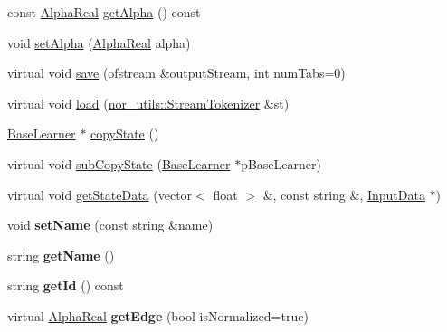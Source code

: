 \begin{DoxyCompactItemize}
\item 
const \hyperlink{Defaults_8h_a80184c4fd10ab70a1a17c5f97dcd1563}{AlphaReal} \hyperlink{classMultiBoost_1_1BaseLearner_acf6c8a1548a2d470172be70ac779a23d}{getAlpha} () const 
\item 
void \hyperlink{classMultiBoost_1_1BaseLearner_a14801c41060f93d612b3f8b143b7641a}{setAlpha} (\hyperlink{Defaults_8h_a80184c4fd10ab70a1a17c5f97dcd1563}{AlphaReal} alpha)
\item 
virtual void \hyperlink{classMultiBoost_1_1BaseLearner_a54e72961217720b3d37083bd07ddf65d}{save} (ofstream \&outputStream, int numTabs=0)
\item 
virtual void \hyperlink{classMultiBoost_1_1BaseLearner_aab8bdddad2c32654a2e77bbaac79345d}{load} (\hyperlink{classnor__utils_1_1StreamTokenizer}{nor\_\-utils::StreamTokenizer} \&st)
\item 
\hyperlink{classMultiBoost_1_1BaseLearner}{BaseLearner} $\ast$ \hyperlink{classMultiBoost_1_1BaseLearner_a80dbf3868f40d419f5bfd9a9469be64f}{copyState} ()
\item 
virtual void \hyperlink{classMultiBoost_1_1BaseLearner_a97532baab5306b08014a2de84c0afcc1}{subCopyState} (\hyperlink{classMultiBoost_1_1BaseLearner}{BaseLearner} $\ast$pBaseLearner)
\item 
virtual void \hyperlink{classMultiBoost_1_1BaseLearner_aa8945cc5179e0b732728571848bfb52f}{getStateData} (vector$<$ float $>$ \&, const string \&, \hyperlink{classMultiBoost_1_1InputData}{InputData} $\ast$)
\item 
\hypertarget{classMultiBoost_1_1BaseLearner_a9a12059f9288ca5717dc85340a15ba66}{
void {\bfseries setName} (const string \&name)}
\label{classMultiBoost_1_1BaseLearner_a9a12059f9288ca5717dc85340a15ba66}

\item 
\hypertarget{classMultiBoost_1_1BaseLearner_a8acb45521f977fb11d954b38a5529272}{
string {\bfseries getName} ()}
\label{classMultiBoost_1_1BaseLearner_a8acb45521f977fb11d954b38a5529272}

\item 
\hypertarget{classMultiBoost_1_1BaseLearner_a52d514132baadf40c05c26a78438903c}{
string {\bfseries getId} () const }
\label{classMultiBoost_1_1BaseLearner_a52d514132baadf40c05c26a78438903c}

\item 
\hypertarget{classMultiBoost_1_1BaseLearner_afa4dcc2bd385613ce210f296b7584b47}{
virtual \hyperlink{Defaults_8h_a80184c4fd10ab70a1a17c5f97dcd1563}{AlphaReal} {\bfseries getEdge} (bool isNormalized=true)}
\label{classMultiBoost_1_1BaseLearner_afa4dcc2bd385613ce210f296b7584b47}

\end{DoxyCompactItemize}
